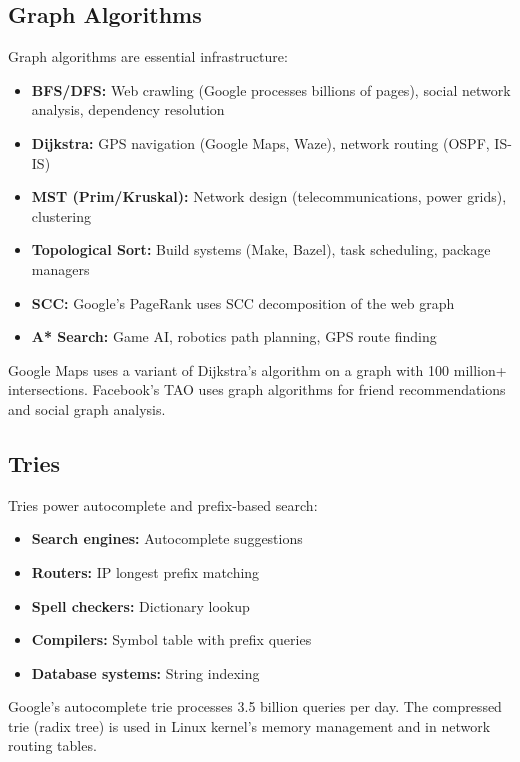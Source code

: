 \subsection{Graph Algorithms}

Graph algorithms are essential infrastructure:
\begin{itemize}
    \item \textbf{BFS/DFS:} Web crawling (Google processes billions of pages), social network analysis, dependency resolution
    \item \textbf{Dijkstra:} GPS navigation (Google Maps, Waze), network routing (OSPF, IS-IS)
    \item \textbf{MST (Prim/Kruskal):} Network design (telecommunications, power grids), clustering
    \item \textbf{Topological Sort:} Build systems (Make, Bazel), task scheduling, package managers
    \item \textbf{SCC:} Google's PageRank uses SCC decomposition of the web graph
    \item \textbf{A* Search:} Game AI, robotics path planning, GPS route finding
\end{itemize}

Google Maps uses a variant of Dijkstra's algorithm on a graph with 100 million+ intersections. Facebook's TAO uses graph algorithms for friend recommendations and social graph analysis.

\subsection{Tries}

Tries power autocomplete and prefix-based search:
\begin{itemize}
    \item \textbf{Search engines:} Autocomplete suggestions
    \item \textbf{Routers:} IP longest prefix matching
    \item \textbf{Spell checkers:} Dictionary lookup
    \item \textbf{Compilers:} Symbol table with prefix queries
    \item \textbf{Database systems:} String indexing
\end{itemize}

Google's autocomplete trie processes 3.5 billion queries per day. The compressed trie (radix tree) is used in Linux kernel's memory management and in network routing tables.

